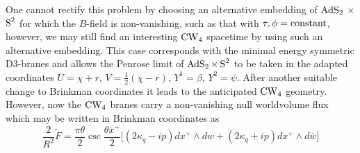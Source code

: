 One cannot rectify this problem by choosing an alternative embedding of $\AdS_2$
$\times$ $\S^2$ for which the $B$-field is non-vanishing, such as that with
$\tau,\phi={\rm constant}$, however, we may still find an interesting $\CW_4$
spacetime by using such an alternative embedding. This case corresponds with the
minimal energy symmetric D3-branes and allows the Penrose limit of
$\AdS_2\times\S^2$ to be taken in the adapted coordinates $U=\chi+r$,
$V=\frac12(\chi-r)$, $Y^1=\beta$, $Y^2=\psi$. After another suitable change to
Brinkman coordinates it leads to the anticipated $\CW_4$ geometry. However, now
the $\CW_4$ branes carry a non-vanishing null worldvolume flux which may be
written in Brinkman coordinates as
\begin{equation}
  \label{tildefluxalt}
  \frac2{R^2}\widetilde{F}=\frac{\pi\theta}2\csc
  \frac{\theta x^+}2\bigl[(2\kappa_q- i p)
  dx^+\wedge dw+(2\kappa_q+ i p) dx^+\wedge d\overline{w}\bigr]
\end{equation}

